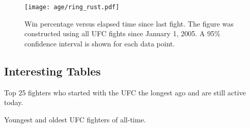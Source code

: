 \begin{figure}[h]
\begin{center}
\texttt{[image: age/ring\_rust.pdf]}
\caption{Win percentage versus elapsed time since last fight. The figure
was constructed using all UFC fights since January 1, 2005. A
95\% confidence interval is shown for each data point.}
\label{ring_rust}
\end{center}
\end{figure}

\clearpage
\subsection*{Interesting Tables}

\begin{center}
\begin{table}[h]

\caption{Top 25 fighters who started with the UFC the longest ago and are still active today.}
\end{table}
\end{center}

\begin{center}
\begin{table}[h]

\caption{Youngest and oldest UFC fighters of all-time.}
\end{table}
\end{center}
